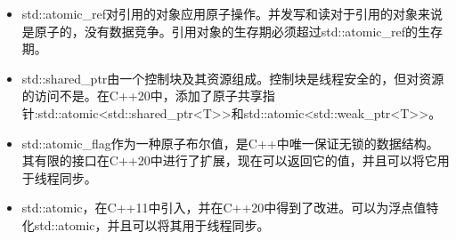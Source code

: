 \begin{tcolorbox}[breakable,enhanced jigsaw,colback=mygreen!5!white,colframe=mygreen!75!black,title={总结}]
	
\begin{itemize}
\item 
std::atomic\_ref对引用的对象应用原子操作。并发写和读对于引用的对象来说是原子的，没有数据竞争。引用对象的生存期必须超过std::atomic\_ref的生存期。

\item 
std::shared\_ptr由一个控制块及其资源组成。控制块是线程安全的，但对资源的访问不是。在C++20中，添加了原子共享指针:std::atomic<std::shared\_ptr<T>{}>和std::atomic<std::weak\_ptr<T>{}>。

\item 
std::atomic\_flag作为一种原子布尔值，是C++中唯一保证无锁的数据结构。其有限的接口在C++20中进行了扩展，现在可以返回它的值，并且可以将它用于线程同步。

\item 
std::atomic，在C++11中引入，并在C++20中得到了改进。可以为浮点值特化std::atomic，并且可以将其用于线程同步。
\end{itemize}
	
\end{tcolorbox}

\newpage








